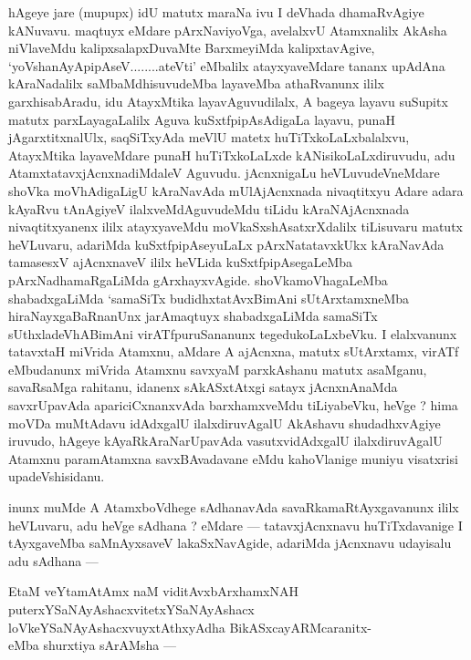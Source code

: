 \begin{artha}
hAgeye jare (mupupx) idU matutx maraNa ivu I deVhada dhamaRvAgiye kANuvavu. maqtuyx eMdare pArxNaviyoVga, avelalxvU Atamxnalilx AkAsha niVlaveMdu kalipxsalapxDuvaMte BarxmeyiMda kalipxtavAgive, `yoV\s shanAyApipAseV........ateVti' eMbalilx atayxyaveMdare tananx upAdAna kAraNadalilx saMbaMdhisuvudeMba layaveMba athaRvanunx ililx garxhisabAradu, idu AtayxMtika layavAguvudilalx, A bageya layavu suSupitx matutx parxLayagaLalilx Aguva kuSxtfpipAsAdigaLa layavu, punaH jAgarxtitxnalUlx, saqSiTxyAda meVlU matetx huTiTxkoLaLxbalalxvu, AtayxMtika layaveMdare punaH huTiTxkoLaLxde kANisikoLaLxdiruvudu, adu AtamxtatavxjAcnxnadiMdaleV Aguvudu. jAcnxnigaLu heVLuvudeVneMdare shoVka moVhAdigaLigU kAraNavAda mUlAjAcnxnada nivaqtitxyu Adare adara kAyaRvu tAnAgiyeV ilalxveMdAguvudeMdu tiLidu kAraNAjAcnxnada nivaqtitxyanenx ililx atayxyaveMdu moVkaSxshAsatxrXdalilx tiLisuvaru matutx heVLuvaru, adariMda kuSxtfpipAseyuLaLx pArxNatatavxkUkx kAraNavAda tamasesxV ajAcnxnaveV ililx heVLida kuSxtfpipAsegaLeMba pArxNadhamaRgaLiMda gArxhayxvAgide. shoVkamoVhagaLeMba shabadxgaLiMda `samaSiTx budidhxtatAvxBimAni sUtArxtamxneMba hiraNayxgaBaRnanUnx jarAmaqtuyx shabadxgaLiMda samaSiTx sUthxladeVhABimAni virATfpuruSananunx tegedukoLaLxbeVku. I elalxvanunx tatavxtaH miVrida Atamxnu, aMdare A ajAcnxna, matutx sUtArxtamx, virATf eMbudanunx miVrida Atamxnu savxyaM parxkAshanu matutx asaMganu, savaRsaMga rahitanu, idanenx sAkASxtAtxgi satayx jAcnxnAnaMda savxrUpavAda apariciCxnanxvAda barxhamxveMdu tiLiyabeVku, heVge ? hima moVDa muMtAdavu idAdxgalU ilalxdiruvAgalU AkAshavu shudadhxvAgiye iruvudo, hAgeye kAyaRkAraNarUpavAda vasutxvidAdxgalU ilalxdiruvAgalU Atamxnu paramAtamxna savxBAvadavane eMdu kahoVlanige muniyu visatxrisi upadeVshisidanu.
\end{artha}


\begin{artha}
inunx muMde A AtamxboVdhege sAdhanavAda savaRkamaRtAyxgavanunx ililx heVLuvaru, adu heVge sAdhana ? eMdare --- tatavxjAcnxnavu huTiTxdavanige I tAyxgaveMba saMnAyxsaveV lakaSxNavAgide, adariMda jAcnxnavu udayisalu adu sAdhana ---

EtaM veYtamAtAmx naM viditAvxbArxhamxNAH puterxYSaNAyAshacxvitetxYSaNAyAshacx loVkeYSaNAyAshacxvuyxtAthxyAdha BikASxcayARMcaranitx-\\
eMba shurxtiya sArAMsha ---
\end{artha}

